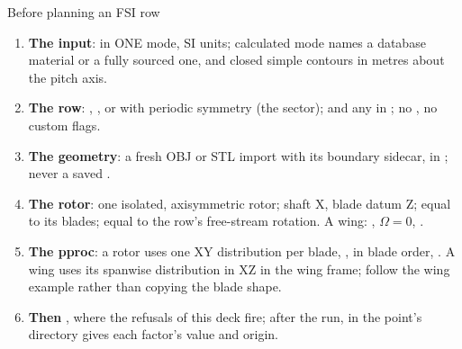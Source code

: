\begin{frame}{Before planning an FSI row}
\begin{enumerate}\small
  \item \textbf{The input}:  in ONE mode, SI units;
        calculated mode names a database material or a fully sourced one, and
        closed simple contours in metres about the pitch axis.
  \item \textbf{The row}:  , , or
         with periodic symmetry (the sector);
         and any  in
        ; no , no custom flags.
  \item \textbf{The geometry}: a fresh OBJ or STL import with its boundary
        sidecar, in ; never a saved .
  \item \textbf{The rotor}: one isolated, axisymmetric rotor; shaft X, blade
        datum Z;  equal to its blades;
         equal to the row's free-stream rotation. A
        wing: , \(\Omega = 0\), .
  \item \textbf{The pproc}: a rotor uses one XY distribution per blade,
        , in blade order, .
        A wing uses its spanwise distribution in XZ in the wing frame;
        follow the wing example rather than copying the blade shape.
  \item \textbf{Then} , where the refusals of this deck
        fire; after the run,  in the point's directory
        gives each factor's value and origin.
\end{enumerate}
\end{frame}

